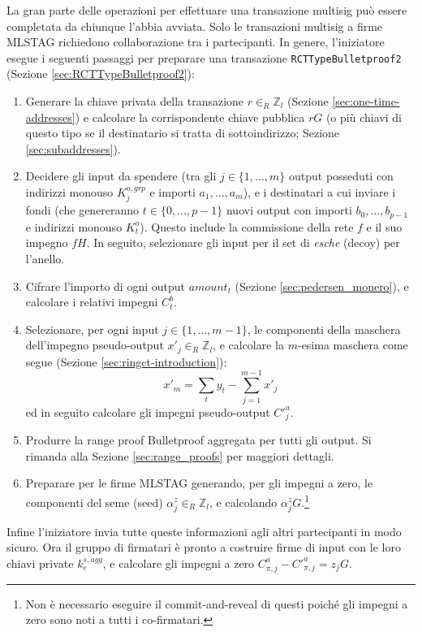 La gran parte delle operazioni per effettuare una transazione multisig può essere completata da chiunque l'abbia avviata. Solo le transazioni multisig a firme MLSTAG richiedono collaborazione tra i partecipanti. In genere, l'iniziatore esegue i seguenti passaggi per preparare una transazione {\tt RCTTypeBulletproof2} (Sezione \ref{sec:RCTTypeBulletproof2}):
\begin{enumerate}
    \item Generare la chiave privata della transazione $r \in_R \mathbb{Z}_l$ (Sezione \ref{sec:one-time-addresses}) e calcolare la corrispondente chiave pubblica $r G$ (o più chiavi di questo tipo se il destinatario si tratta di sottoindirizzo; Sezione \ref{sec:subaddresses}).
    \item Decidere gli input da spendere (tra gli $j \in \{1,...,m\}$ output posseduti con indirizzi monouso $K^{o,grp}_j$ e importi $a_1,...,a_m$), e i destinatari a cui inviare i fondi (che genereranno $t \in \{0,...,p-1\}$ nuovi output con importi $b_0,...,b_{p-1}$ e indirizzi monouso $K^{o}_t$). Questo include la commissione della rete $f$ e il suo impegno $f H$. In seguito, selezionare gli input per il set di \emph{esche} (decoy) per l'anello.
    \item Cifrare l'importo di ogni output $\mathit{amount}_t$ (Sezione \ref{sec:pedersen_monero}), e calcolare i relativi impegni $C^b_t$.
    \item Selezionare, per ogni input $j \in \{1,...,m-1\}$, le componenti della maschera dell'impegno pseudo-output $x'_{j} \in_R \mathbb{Z}_l$, e calcolare la $m$-esima maschera come segue (Sezione \ref{sec:ringct-introduction}):
    \[x'_m = \sum_t y_t - \sum_{j=1}^{m-1} x'_j\]
    ed in seguito calcolare gli impegni pseudo-output $C'^a_{j}$.
    \item Produrre la range proof Bulletproof aggregata per tutti gli output. Si rimanda alla Sezione \ref{sec:range_proofs} per maggiori dettagli.
    \item Preparare per le firme MLSTAG generando, per gli impegni a zero, le componenti del seme (seed) $\alpha^z_{j} \in_R \mathbb{Z}_l$, e calcolando $\alpha^z_{j} G$.\footnote{Non è necessario eseguire il commit-and-reveal di questi poiché gli impegni a zero sono noti a tutti i co-firmatari.}
\end{enumerate}

Infine l'iniziatore invia tutte queste informazioni agli altri partecipanti in modo sicuro. Ora il gruppo di firmatari è pronto a costruire firme di input con le loro chiavi private $k^{s,agg}_e$, e calcolare gli impegni a zero $C^a_{\pi,j} - C'^a_{\pi,j} = z_j G$.

